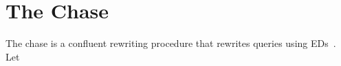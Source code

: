 \documentclass[preprint]{sigplanconf}
\begin{document}
%
%


\section{The Chase}
\label{sec:chase}

The chase is a confluent rewriting procedure that rewrites queries using EDs~\cite{foundations}.   Let
\end{document}
